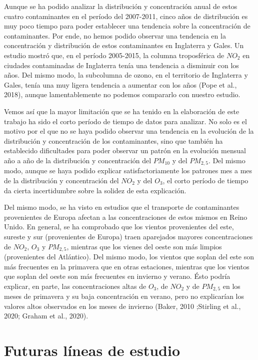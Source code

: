 \documentclass[12pt]{article}
\begin{document}
Aunque se ha podido analizar la distribución y concentración anual de estos cuatro contaminantes en el período del 2007-2011, cinco años de distribución es muy poco tiempo para poder establecer una tendencia sobre la concentración de contaminantes. Por ende, no hemos podido observar una tendencia en la concentración y distribución de estos contaminantes en Inglaterra y Gales. Un estudio mostró que, en el período 2005-2015, la columna troposférica de $NO_{2}$ en ciudades contaminadas de Inglaterra tenía una tendencia a disminuir con los años. Del mismo modo, la subcolumna de ozono, en el territorio de Inglaterra y Gales, tenía una muy ligera tendencia a aumentar con los años (Pope et al., 2018), aunque lamentablemente no podemos compararlo con nuestro estudio.

Vemos así que la mayor limitación que se ha tenido en la elaboración de este trabajo ha sido el corto período de tiempo de datos para analizar. No solo es el motivo por el que no se haya podido observar una tendencia en la evolución de la distribución y concentración de los contaminantes, sino que también ha establecido dificultades para poder observar un patrón en la evolución mensual año a año de la distribución y concentración del $PM_{10}$ y del $PM_{2,5}$. Del mismo modo, aunque se haya podido explicar satisfactoriamente los patrones mes a mes de la distribución y concentración del $NO_{2}$ y del $O_{3}$, el corto período de tiempo da cierta incertidumbre sobre la solidez de esta explicación.

Del mismo modo, se ha visto en estudios que el transporte de contaminantes provenientes de Europa afectan a las concentraciones de estos mismos en Reino Unido. En general, se ha comprobado que los vientos provenientes del este, sureste y sur (provenientes de Europa) traen aparejados mayores concentraciones de $NO_{2}$, $O_{3}$ y $PM_{2,5}$, mientras que los vienes del oeste son más limpios (provenientes del Atlántico). Del mismo modo, los vientos que soplan del este son más frecuentes en la primavera que en otras estaciones, mientras que los vientos que soplan del oeste son más frecuentes en invierno y verano. Ésto podría explicar, en parte, las concentraciones altas de $O_{3}$, de $NO_{2}$ y de $PM_{2,5}$ en los meses de primavera y su baja concentración en verano, pero no explicarían los valores altos observados en los meses de invierno (Baker, 2010 ;Stirling et al., 2020; Graham et al., 2020).
\newpage

\section{Futuras líneas de estudio}
\end{document}
